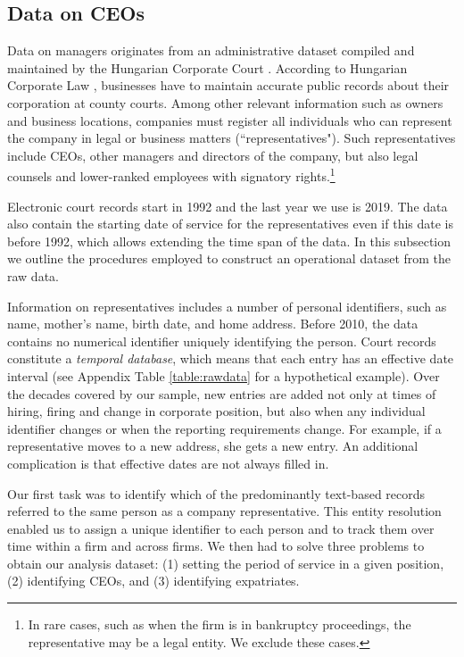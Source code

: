 \documentclass[12pt,a4paper]{article}
\begin{document}
\subsection{Data on CEOs}

Data on managers originates from an administrative dataset compiled and maintained by the Hungarian Corporate Court \citep{cegjegyzek}. According to Hungarian Corporate Law \citep{cegtv}, businesses have to maintain accurate public records about their corporation at county courts. Among other relevant information such as owners and business locations, companies must register all individuals who can represent the company in legal or business matters (``representatives"). Such representatives include CEOs, other managers and directors of the company, but also legal counsels and lower-ranked employees with signatory rights.\footnote{In rare cases, such as when the firm is in bankruptcy proceedings, the representative may be a legal entity. We exclude these cases.}

Electronic court records start in 1992 and the last year we use is 2019. The data also contain the starting date of service for the representatives even if this date is before 1992, which allows extending the time span of the data. In this subsection we outline the procedures employed to construct an operational dataset from the raw data.

Information on representatives includes a number of personal identifiers, such as name, mother's name, birth date, and home address. Before 2010, the data contains no numerical identifier uniquely identifying the person. Court records constitute a \emph{temporal database}, which means that each entry has an effective date interval (see Appendix Table \ref{table:rawdata} for a hypothetical example). Over the decades covered by our sample, new entries are added not only at times of hiring, firing and change in corporate position, but also when any individual identifier changes or when the reporting requirements change. For example, if a representative moves to a new address, she gets a new entry. An additional complication is that effective dates are not always filled in. 

Our first task was to identify which of the predominantly text-based records referred to the same person as a company representative. This entity resolution enabled us to assign a unique identifier to each person and to track them over time within a firm and across firms. We then had to solve three problems to obtain our analysis dataset: (1) setting the period of service in a given position, (2) identifying CEOs, and (3) identifying expatriates.
\end{document}
